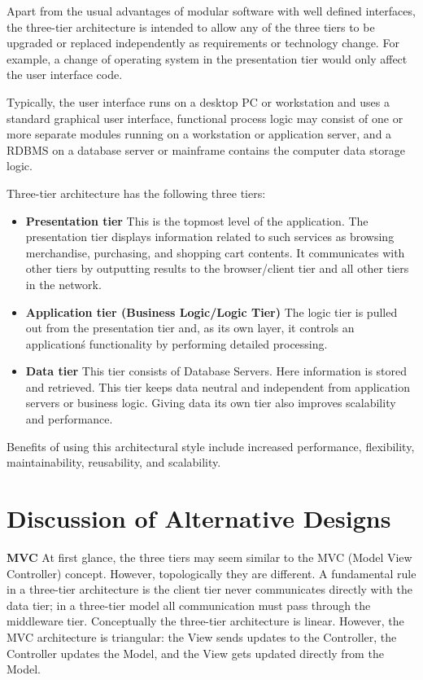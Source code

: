 \documentclass[salesmen, twoside]{../../../templates/latex/2009/softproj}
\begin{document}
\begin{projdoc}
Apart from the usual advantages of modular software with well defined interfaces, the three-tier architecture is intended to allow any of the three tiers to be upgraded or replaced independently as requirements or technology change. For example, a change of operating system in the presentation tier would only affect the user interface code.

Typically, the user interface runs on a desktop PC or workstation and uses a standard graphical user interface, functional process logic may consist of one or more separate modules running on a workstation or application server, and a RDBMS on a database server or mainframe contains the computer data storage logic.

Three-tier architecture has the following three tiers:
\begin{itemize}
\item \textbf{Presentation tier}
This is the topmost level of the application. The presentation tier displays information related to such services as browsing merchandise, purchasing, and shopping cart contents. It communicates with other tiers by outputting results to the browser/client tier and all other tiers in the network.
\item \textbf{Application tier (Business Logic/Logic Tier)}
The logic tier is pulled out from the presentation tier and, as its own layer, it controls an application\'s functionality by performing detailed processing.
\item \textbf{Data tier}
This tier consists of Database Servers. Here information is stored and retrieved. This tier keeps data neutral and independent from application servers or business logic. Giving data its own tier also improves scalability and performance. 
\end{itemize}

Benefits of using this architectural style include increased performance, flexibility, maintainability, reusability, and scalability.
\section{Discussion of Alternative Designs}
\textbf{MVC}
At first glance, the three tiers may seem similar to the MVC (Model View Controller) concept. However, topologically they are different. A fundamental rule in a three-tier architecture is the client tier never communicates directly with the data tier; in a three-tier model all communication must pass through the middleware tier. Conceptually the three-tier architecture is linear. However, the MVC architecture is triangular: the View sends updates to the Controller, the Controller updates the Model, and the View gets updated directly from the Model.


\end{projdoc}
\end{document}

